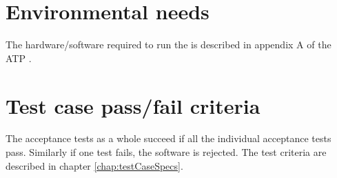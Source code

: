 \section{Environmental needs}
The hardware/software required to run the \applicationname{} is described in appendix A of the ATP \cite{atp}.

\section{Test case pass/fail criteria}
The acceptance tests as a whole succeed if all the individual acceptance tests pass. Similarly if one test fails, the software is rejected.
The test criteria are described in chapter \ref{chap:testCaseSpecs}.